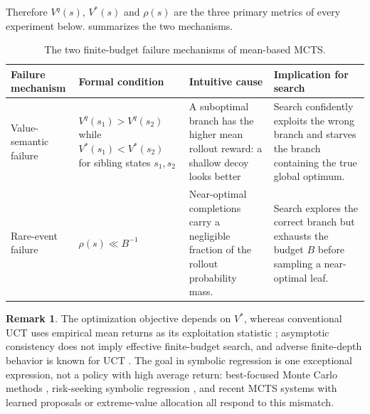 \documentclass[11pt, a4paper]{article}
\theoremstyle{definition}
\newtheorem{rem}[thm]{Remark}
\newcommand{\noi}{\noindent}
\begin{document}
\noi Therefore \(V^q(s)\), \(V^*(s)\) and \(\rho(s)\) are the
three primary metrics of every experiment below.
 summarizes the two mechanisms.

\begin{table}[thbp!]
    \centering
    \footnotesize
    \renewcommand{\arraystretch}{1.35}
    \begin{tabular}{@{}
        >{\raggedright\arraybackslash}p{2.2cm}
        >{\raggedright\arraybackslash}p{3.4cm}
        >{\raggedright\arraybackslash}p{4.3cm}
        >{\raggedright\arraybackslash}p{4.5cm}
        @{}}
        \toprule
        \textbf{Failure mechanism} & \textbf{Formal condition} &
        \textbf{Intuitive cause} & \textbf{Implication for search} \\
        \midrule
        Value-semantic failure &
        \(V^q(s_1) > V^q(s_2)\) while \(V^*(s_1) < V^*(s_2)\)
        for sibling states \(s_1, s_2\) &
        A suboptimal branch has the higher mean rollout reward: a shallow
        decoy looks better &
        Search confidently exploits the wrong branch and starves the branch
        containing the true global optimum. \\
        \addlinespace
        Rare-event failure &
        \(\rho(s) \ll B^{-1}\) &
        Near-optimal completions carry a negligible fraction of the rollout
        probability mass. &
        Search explores the correct branch but exhausts the budget \(B\)
        before sampling a near-optimal leaf. \\
        \bottomrule
    \end{tabular}
    \caption{The two finite-budget failure mechanisms of mean-based MCTS.}
    \label{tab:failure-modes}
\end{table}

\begin{rem}
The optimization objective depends on \(V^*\), whereas conventional UCT uses
empirical mean returns as its exploitation statistic \cite{kocsis2006bandit};
asymptotic consistency does not imply effective finite-budget search, and
adverse finite-depth behavior is known for UCT \cite{coquelin2007bandit}.
The goal in symbolic regression is one exceptional expression, not a policy
with high average return: best-focused Monte Carlo methods
\cite{cazenave2009nested,cazenave2013montecarlo}, risk-seeking symbolic
regression \cite{petersen2021deep}, and recent MCTS systems with learned
proposals or extreme-value allocation
\cite{kamienny2023deep,huang2025improving} all respond to this mismatch.
\end{rem}
\end{document}
